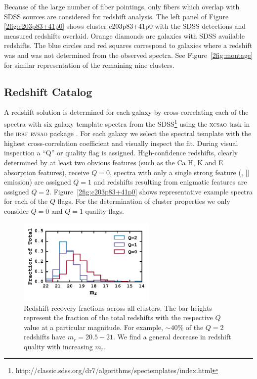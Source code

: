 Because of the large number of fiber pointings, only fibers which overlap with SDSS sources are considered for redshift analysis. The left panel of Figure \ref{2fig:c203p83+41p0} shows cluster c203p83+41p0 with the SDSS detections and measured redshifts overlaid. Orange diamonds are galaxies with SDSS available redshifts. The blue circles and red squares correspond to galaxies where a redshift was and was not determined from the observed spectra. See Figure~\ref{2fig:montage} for similar representation of the remaining nine clusters.

\subsection{Redshift Catalog}\label{2sec:redshift catalog} 
A redshift solution is determined for each galaxy by cross-correlating \citep{Tonry1979} each of the spectra with six galaxy template spectra from the SDSS\footnote{http://classic.sdss.org/dr7/algorithms/spectemplates/index.html} using the \textsc{xcsao} task in the \textsc{iraf} \textsc{rvsao} package \citep{Kurtz1992, Kurtz1998}. For each galaxy we select the spectral template with the highest cross-correlation coefficient and visually inspect the fit. During visual inspection a ``Q'' or quality flag is assigned. High-confidence redshifts, clearly determined by at least two obvious features (such as the Ca H, K and E absorption features), receive $Q=0$, spectra with only a single strong feature (\eg, \hbox{[]} emission) are assigned $Q=1$ and redshifts resulting from enigmatic features are assigned $Q=2$. Figure~\ref{2fig:c203p83+41p0} shows representative example spectra for each of the $Q$ flags. For the determination of cluster properties we only consider $Q=0$ and $Q=1$ quality flags. 

\begin{figure}[t]
	\includegraphics[width=0.6\textwidth]{figures2/redshiftHist.pdf} 
	\caption{Redshift recovery fractions across all clusters. The bar heights represent the fraction of the total redshifts with the respective $Q$ value at a particular magnitude. For example, $\sim 40\%$ of the $Q=2$ redshifts have $m_r = 20.5-21$. We find a general decrease in redshift quality with increasing $m_r$. } \label{2fig:redshiftHist} 
\end{figure}

